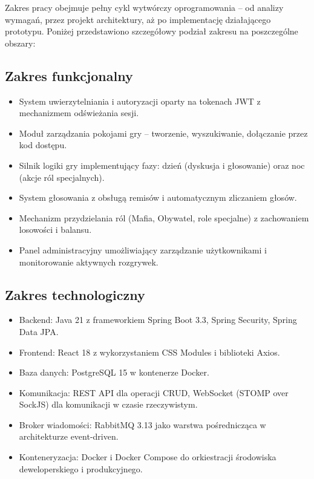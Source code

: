 ﻿\documentclass[a4paper,twoside,11pt]{mwrep}
\theoremstyle{plain} \newtheorem{thm}{Twierdzenie}
\theoremstyle{plain} \newtheorem{lem}{Lemat}
\theoremstyle{definition} \newtheorem{defn}{Definicja}
\theoremstyle{remark} \newtheorem*{rem}{Wniosek}
\begin{document}
Zakres pracy obejmuje pełny cykl wytwórczy oprogramowania -- od analizy wymagań, przez projekt architektury, aż po implementację działającego prototypu. Poniżej przedstawiono szczegółowy podział zakresu na poszczególne obszary:

\subsection{Zakres funkcjonalny}
\begin{itemize}
    \item System uwierzytelniania i autoryzacji oparty na tokenach JWT z mechanizmem odświeżania sesji.
    \item Moduł zarządzania pokojami gry -- tworzenie, wyszukiwanie, dołączanie przez kod dostępu.
    \item Silnik logiki gry implementujący fazy: dzień (dyskusja i głosowanie) oraz noc (akcje ról specjalnych).
    \item System głosowania z obsługą remisów i automatycznym zliczaniem głosów.
    \item Mechanizm przydzielania ról (Mafia, Obywatel, role specjalne) z zachowaniem losowości i balansu.
    \item Panel administracyjny umożliwiający zarządzanie użytkownikami i monitorowanie aktywnych rozgrywek.
\end{itemize}

\subsection{Zakres technologiczny}
\begin{itemize}
    \item Backend: Java 21 z frameworkiem Spring Boot 3.3, Spring Security, Spring Data JPA.
    \item Frontend: React 18 z wykorzystaniem CSS Modules i biblioteki Axios.
    \item Baza danych: PostgreSQL 15 w kontenerze Docker.
    \item Komunikacja: REST API dla operacji CRUD, WebSocket (STOMP over SockJS) dla komunikacji w czasie rzeczywistym.
    \item Broker wiadomości: RabbitMQ 3.13 jako warstwa pośrednicząca w architekturze event-driven.
    \item Konteneryzacja: Docker i Docker Compose do orkiestracji środowiska deweloperskiego i produkcyjnego.
\end{itemize}
\end{document}
